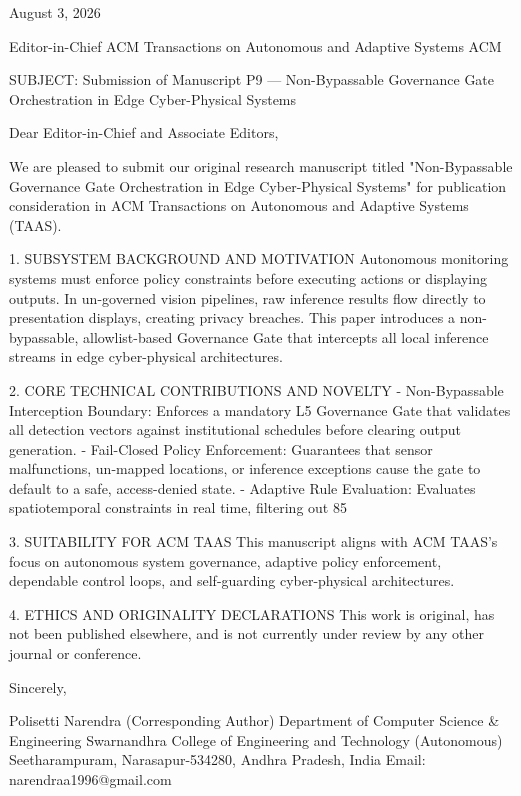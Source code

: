 August 3, 2026

Editor-in-Chief
ACM Transactions on Autonomous and Adaptive Systems
ACM

SUBJECT: Submission of Manuscript P9 — Non-Bypassable Governance Gate Orchestration in Edge Cyber-Physical Systems

Dear Editor-in-Chief and Associate Editors,

We are pleased to submit our original research manuscript titled "Non-Bypassable Governance Gate Orchestration in Edge Cyber-Physical Systems" for publication consideration in ACM Transactions on Autonomous and Adaptive Systems (TAAS).

1. SUBSYSTEM BACKGROUND AND MOTIVATION
Autonomous monitoring systems must enforce policy constraints before executing actions or displaying outputs. In un-governed vision pipelines, raw inference results flow directly to presentation displays, creating privacy breaches. This paper introduces a non-bypassable, allowlist-based Governance Gate that intercepts all local inference streams in edge cyber-physical architectures.

2. CORE TECHNICAL CONTRIBUTIONS AND NOVELTY
  - Non-Bypassable Interception Boundary: Enforces a mandatory L5 Governance Gate that validates all detection vectors against institutional schedules before clearing output generation.
  - Fail-Closed Policy Enforcement: Guarantees that sensor malfunctions, un-mapped locations, or inference exceptions cause the gate to default to a safe, access-denied state.
  - Adaptive Rule Evaluation: Evaluates spatiotemporal constraints in real time, filtering out 85%

3. SUITABILITY FOR ACM TAAS
This manuscript aligns with ACM TAAS's focus on autonomous system governance, adaptive policy enforcement, dependable control loops, and self-guarding cyber-physical architectures.

4. ETHICS AND ORIGINALITY DECLARATIONS
This work is original, has not been published elsewhere, and is not currently under review by any other journal or conference.

Sincerely,

Polisetti Narendra (Corresponding Author)
Department of Computer Science & Engineering
Swarnandhra College of Engineering and Technology (Autonomous)
Seetharampuram, Narasapur-534280, Andhra Pradesh, India
Email: narendraa1996@gmail.com
